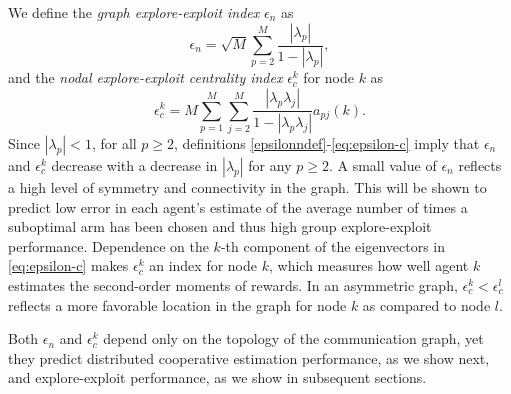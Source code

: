\documentclass[final,5p,times,twocolumn]{elsarticle}
\theoremstyle{definition}
\begin{document}
We define the {\em graph explore-exploit index} $\epsilon_n$ as
\begin{equation}
\epsilon_n =  \sqrt{M}  \sum_{p=2}^M \frac{|\lambda_p|}{1-|\lambda_p|},  \label{epsilonndef}
\end{equation}
and the {\em nodal explore-exploit centrality index} $\epsilon_c^k$ for node $k$ as 
\begin{equation}\label{eq:epsilon-c}
\epsilon_c^k   =    M \sum_{p=1}^M \sum_{j=2}^M \frac{|\lambda_p \lambda_j| }{1-|\lambda_p \lambda_j|} a_{pj}(k).
\end{equation}
Since $|\lambda_p|< 1$, for all $p \geq 2$, definitions \eqref{epsilonndef}-\eqref{eq:epsilon-c} imply that $\epsilon_n$ and $\epsilon_c^k$ decrease with a decrease in $|\lambda_p|$ for any $p \geq 2$. A small value of $\epsilon_n$ reflects a high level of symmetry and connectivity in the graph. This will be shown to predict low error in each agent's estimate of the average number of times a suboptimal arm has been chosen and thus high group explore-exploit performance. Dependence on the $k$-th component of the eigenvectors in \eqref{eq:epsilon-c} makes $\epsilon_c^k$ an index for node $k$, which measures how well agent $k$ estimates the second-order moments of rewards.  In an asymmetric graph, $\epsilon_c^k < \epsilon_c^l$ reflects a more favorable location in the graph for node $k$ as compared to node $l$. 

Both $\epsilon_n$ and $\epsilon_c^k$ depend only on the topology of the communication graph, yet they predict distributed cooperative estimation performance, as we show next, and  explore-exploit performance, as we show in subsequent sections.
\end{document}
